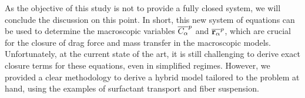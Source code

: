 


As the objective of this study is not to provide a fully closed system, we will conclude the discussion on this point.
In short, this new system of equations can be used to determine the macroscopic variables $\overline{C_\alpha}^{p}$ and $\overline{\textbf{r}_\alpha}^{p}$, which are crucial for the closure of drag force and mass transfer in the macroscopic models.
Unfortunately, at the current state of the art, it is still challenging to derive exact closure terms for these equations, even in simplified regimes. 
However, we provided a clear methodology to derive a hybrid model tailored to the problem at hand, using the examples of surfactant transport and fiber suspension. 